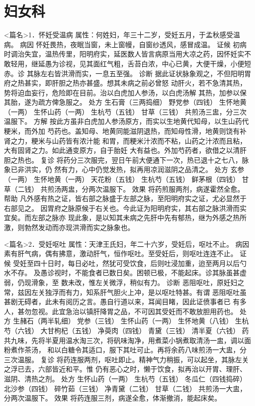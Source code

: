 \documentclass[a4paper,12pt,UTF8,twoside]{ctexbook}
\begin{document}
\chapter{妇女科}
<篇名>1．怀妊受温病
属性：何姓妇，年三十二岁，受妊五月，于孟秋感受温病。 
病因 怀妊畏热，夜眠当窗，未上窗幔，自窗纱透风，感冒成温。 
证候 初病时调治失宜，温热传里，阳明府实，延医数人皆言病原当用大凉之药，因怀妊实不 
敢轻用，继延愚为诊视，见其面红气粗，舌苔白浓，中心已黄，大便干燥，小便短赤。诊 
其脉左右皆洪滑而实，一息五至强。 
诊断 据此证状脉象观之，不但阳明胃府之热甚实，即肝胆之热亦甚盛。想其未病之前必曾怒 
动肝火，若不急清其热，势将迫血妄行，危险即在目前。治以白虎加人参汤，以白虎汤解 
其热，加参以保其胎，遂为疏方俾急服之。 
处方 生石膏（三两捣细） 野党参（四钱） 生怀地黄（一两） 生怀山药（一两） 
生杭芍（五钱） 甘草（三钱） 
共煎汤三盅，分三次温服下。 
方解 按此方虽非白虎加人参汤原方，而实以生地黄代知母，以生山药代粳米，而外加 
芍药也。盖知母、地黄同能滋阴退热，而知母性滑，地黄则饶有补肾之力，粳米与山药皆有浓汁能 
和胃，而粳米汁浓而不粘，山药之汁浓而且粘，大有固肾之力。如此通变原方，自于胎妊 
大有益也。外加芍药者，欲借之以清肝胆之热也。 
复诊 将药分三次服完，翌日午前大便通下一次，热已退十之七八，脉象已非洪实，仍 
然有力，心中仍觉发热，拟再用凉润滋阴之品清之。 
处方 玄参（一两） 生怀地黄（一两） 天花粉（五钱） 生杭芍（五钱） 
鲜茅根（四钱） 甘草（二钱） 
共煎汤两盅，分两次温服下。 
效果 将药煎服两剂，病遂霍然全愈。 
帮助 凡外感有热之证，皆右部之脉盛于左部之脉，至阳明府实之证，尤必显然于右部见之。 
因胃府之脉原候于右关也。今此证为阳明府实，其右部之脉洪滑而实宜矣。而左部之脉亦 
现此象，是以知其未病之先肝中先有郁热，继为外感之热所激，则勃然发动而亦现洪滑而实之脉象也。 


<篇名>2．受妊呕吐
属性：天津王氏妇，年二十六岁，受妊后，呕吐不止。 
病因 素有肝气病，偶有拂意，激动肝气，恒作呕吐。至受妊后，则呕吐连连不止。 
证候 受妊至四十日时，每日必吐，然犹可受饮食，后则吐浸加重，迨至两月以后勺水不存。 
及愚诊视时，不能食者已数日矣。困顿已极，不能起床。诊其脉虽甚虚弱，仍现滑象，至 
数未改，惟左关微浮，稍似有力。 
诊断 恶阻呕吐，原妊妇之常，兹因左关独浮而有力，知系肝气胆火上冲，是以呕吐特甚。有谓 
恶阻呕吐虽甚剧无碍者，此未有阅历之言。愚自行道以来，耳闻目睹，因此证偾事者已 
有多人，甚勿忽视。此宜急治以镇肝降胃之品，不可因其受妊而不敢放胆用药也。 
处方 生赭石（两半轧细） 党参（三钱） 生怀山药（一两） 生怀地黄（八钱） 
生杭芍（六钱） 大甘枸杞（五钱） 净萸肉（四钱） 青黛（三钱） 清半夏（六钱） 
药共九味，先将半夏用温水淘三次，将矾味淘净，用煮菜小锅煮取清汤一盅，调以面粉煮作茶汤， 
和以白糖令其适口，服下其吐可止。再将余药八味煎汤一大盅，分三次温服。 
复诊 将药连服两剂，呕吐即止。精神气力稍振，可以起坐，其脉左关之浮已去，六部皆近和平。惟 
仍有恶心之时，懒于饮食，拟再治以开胃、理肝、滋阴、清热之剂。 
处方 生怀山药（一两） 生杭芍（五钱） 冬瓜仁（四钱捣碎） 北沙参（四钱） 
碎竹茹（三钱） 净青黛（二钱） 甘草（二钱） 
共煎汤一大盅，分两次温服下。 
效果 将药连服三剂，病遂全愈，体渐撤消，能起床矣。 
\end{document}
